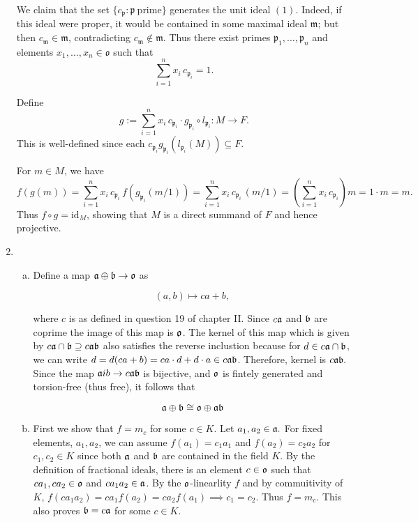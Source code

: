 \documentclass{article}
\theoremstyle{definition}
\theoremstyle{remark}
\begin{document}
\begin{enumerate}[(1)]
            We claim that the set $\{c_{\mathfrak{p}} : \mathfrak{p} \ \text{prime}\}$ generates the unit ideal $(1)$.
            Indeed, if this ideal were proper, it would be contained in some maximal ideal $\mathfrak{m}$; but then $c_{\mathfrak{m}} \in \mathfrak{m}$, contradicting $c_{\mathfrak{m}} \notin \mathfrak{m}$.
            Thus there exist primes $\mathfrak{p}_1, \dots, \mathfrak{p}_n$ and elements $x_1,\dots,x_n \in \mathfrak{o}$ such that
            \[
            \sum_{i=1}^n x_i\, c_{\mathfrak{p}_i} = 1.
            \]

            Define
            \[
            g := \sum_{i=1}^n x_i\, c_{\mathfrak{p}_i} \cdot g_{\mathfrak{p}_i} \circ l_{\mathfrak{p}_i} : M \to F.
            \]
            This is well-defined since each $c_{\mathfrak{p}_i} g_{\mathfrak{p}_i}(l_{\mathfrak{p}_i}(M)) \subseteq F$.

            For $m \in M$, we have
            \[
            f(g(m))
            = \sum_{i=1}^n x_i\, c_{\mathfrak{p}_i} \, f(g_{\mathfrak{p}_i}(m/1))
            = \sum_{i=1}^n x_i\, c_{\mathfrak{p}_i} \, (m/1)
            = \left(\sum_{i=1}^n x_i\, c_{\mathfrak{p}_i}\right) m
            = 1 \cdot m
            = m.
            \]
        Thus $f \circ g = \mathrm{id}_M$, showing that $M$ is a direct summand of $F$ and hence projective.


  \item

        \newcommand{\ia}{\I a}
        \newcommand{\ib}{\I b}
        \newcommand{\ic}{\I c}
        \begin{enumerate}[(a)]
          \item Define a map $\ia \oplus \ib \to \io$ as

                $$ (a, b) \mapsto ca + b,$$

                where $c$ is as defined in question 19 of chapter II. Since $c\ia$ and $\ib$ are coprime the image of this map is $\mathfrak{o}$. The kernel of this map which is given by $c\ia \cap \ib \supseteq c\ia\ib$ also satisfies the reverse inclustion because for $d \in c\ia \cap \ib$, we can write $d = d(ca + b) = ca\cdot d + d\cdot a \in c\ia \ib$. Therefore, kernel is $c\ia \ib.$ Since the map $\ia ib \to c\ia\ib$ is bijective, and $\mathfrak{o}$ is fintely generated and torsion-free (thus free), it follows that

                $$\ia \oplus \ib \iso \io \oplus \ia \ib$$

          \item
                First we show that $f = m_c$ for some $c \in K$. Let $a_1, a_2 \in \ia.$ For fixed elements, $a_1, a_2$, we can assume $f(a_1) = c_1a_1$ and $f(a_2) = c_2a_2$ for $c_1, c_2\in K$ since both $\ia$ and $\ib$ are contained in the field $K$. By the definition of fractional ideals, there is an element $c \in \mathfrak{o}$ such that $ca_1, ca_2 \in \mathfrak{o}$ and $ca_1a_2 \in \ia$. By the $\mathfrak{o}$-linearlity $f$ and by commuitivity of $K$, $f(ca_1a_2) = ca_1f(a_2) = ca_2f(a_1) \implies c_1 = c_2$. Thus $f = m_c$. This also proves $\ib = c\ia$ for some $c \in K$.



\end{enumerate}
\end{enumerate}
\end{document}
